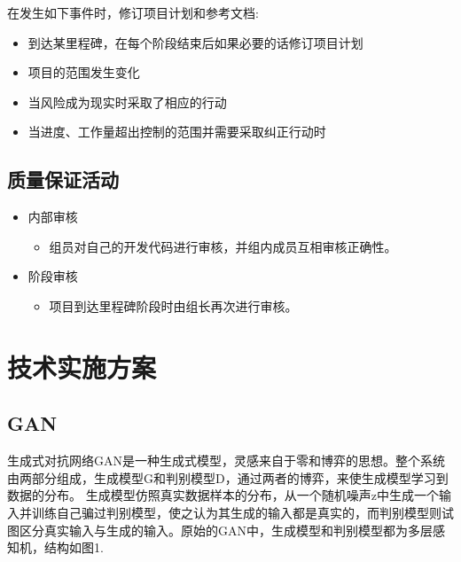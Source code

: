 \documentclass[hyperref, a4paper]{ctexart}
\providecommand{\tightlist}{%
  \setlength{\itemsep}{0pt}\setlength{\parskip}{0pt}}
\begin{document}
在发生如下事件时，修订项目计划和参考文档:

\begin{itemize}
\tightlist
\item
  到达某里程碑，在每个阶段结束后如果必要的话修订项目计划
\item
  项目的范围发生变化
\item
  当风险成为现实时采取了相应的行动
\item
  当进度、工作量超出控制的范围并需要采取纠正行动时
\end{itemize}

\hypertarget{ux8d28ux91cfux4fddux8bc1ux6d3bux52a8}{%
\subsection{质量保证活动}\label{ux8d28ux91cfux4fddux8bc1ux6d3bux52a8}}

\begin{itemize}
\tightlist
\item
  内部审核

  \begin{itemize}
  \tightlist
  \item
    组员对自己的开发代码进行审核，并组内成员互相审核正确性。
  \end{itemize}
\item
  阶段审核

  \begin{itemize}
  \tightlist
  \item
    项目到达里程碑阶段时由组长再次进行审核。
  \end{itemize}
\end{itemize}

\hypertarget{ux6280ux672fux5b9eux65bdux65b9ux6848}{%
\section{技术实施方案}\label{ux6280ux672fux5b9eux65bdux65b9ux6848}}

\hypertarget{gan}{%
\subsection{GAN}\label{gan}}

生成式对抗网络GAN是一种生成式模型，灵感来自于零和博弈的思想。整个系统由两部分组成，生成模型G和判别模型D，通过两者的博弈，来使生成模型学习到数据的分布。
生成模型仿照真实数据样本的分布，从一个随机噪声z中生成一个输入并训练自己骗过判别模型，使之认为其生成的输入都是真实的，而判别模型则试图区分真实输入与生成的输入。原始的GAN中，生成模型和判别模型都为多层感知机，结构如图1.
\end{document}
